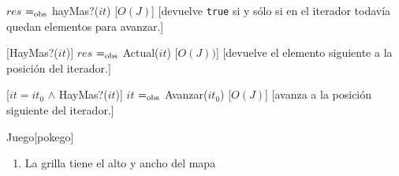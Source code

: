 \begin{Interfaz}
	{$res$ $=_{\mathrm{obs}}$ hayMas?($it$)}
	[$O(J)$]
	[devuelve \texttt{true} si y sólo si en el iterador todavía quedan elementos para avanzar.]

	[HayMas?($it$)]
	{$res$ $=_{\mathrm{obs}}$ Actual($it$)}
	[$O(J))$]
	[devuelve el elemento siguiente a la posición del iterador.]

	[$it = it_0$ $\land$ HayMas?($it$)]
	{$it$ $=_{\mathrm{obs}}$ Avanzar($it_0$)}
	[$O(J)$]
	[avanza a la posición siguiente del iterador.]
\end{Interfaz}

\begin{Representacion}


	\begin{Estructura}{Juego}[pokego]
		\begin{Tupla}[pokego]
		\end{Tupla}

		\begin{Tupla}[infoJugador]
		\end{Tupla}

		\begin{Tupla}[infoPos]
		\end{Tupla}

	\end{Estructura}
	

	\begin{enumerate}

		\item La grilla tiene el alto y ancho del mapa 


\end{enumerate}
\end{Representacion}
